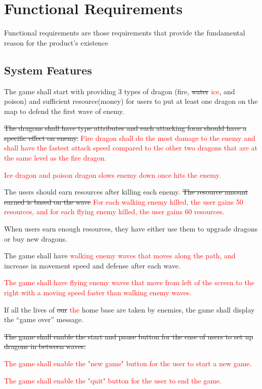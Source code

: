 \documentclass{article}
\begin{document}
\section{Functional Requirements}
Functional requirements are those requirements that provide the fundamental reason for the product's existence

\subsection{System Features}
\begin{itemize}
    \item The game shall start with providing 3 types of dragon (fire, \st{water} \textcolor{red}{ice}, and poison) and sufficient resource(money) for users to put at least one dragon on the map to defend the first wave of enemy.
    \item \st{The dragons shall have type attributes and each attacking form should have a specific effect on enemy.} \textcolor{red}{Fire dragon shall do the most damage to the enemy and shall have the fastest attack speed compared to the other two dragons that are at the same level as the fire dragon.}
    \textcolor{red}{\item Ice dragon and poison dragon slows enemy down once hits the enemy. } 
    \item The users should earn resources after killing each enemy. \st{The resource amount earned is based on the wave} \textcolor{red}{For each walking enemy killed, the user gains 50 resources, and for each flying enemy killed, the user gains 60 resources. } 
    \item When users earn enough resources, they have either use them to upgrade dragons or buy new dragons.
    \item The game shall have \textcolor{red}{walking enemy waves that moves along the path, and } increase in movement speed and defense after each wave.
    \textcolor{red}{\item The game shall have flying enemy waves that move from left of the screen to the right with a moving speed faster than walking enemy waves.}
    \item If all the lives of \st{our} \textcolor{red}{the} home base are taken by enemies, the game shall display the “game over” message.
    \item \st{The game shall enable the start and pause button for the ease of users to set up dragons in between waves.}
    \textcolor{red}{\item The game shall enable the "new game" button for the user to start a new game.}
    \textcolor{red}{\item The game shall enable the "quit" button for the user to end the game.}
\end{itemize}
\end{document}
